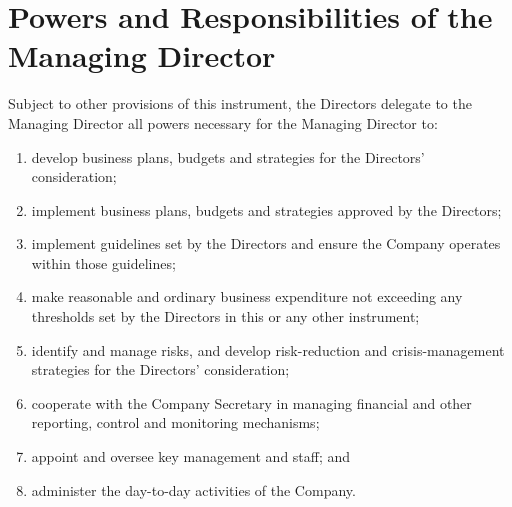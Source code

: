 \documentclass[a4paper,10pt]{article}
\renewcommand{\labelenumi}{(\arabic{enumi})}
\begin{document}
\section{Powers and Responsibilities of the Managing Director}

Subject to other provisions of this instrument, the Directors delegate to the Managing Director all powers necessary for the Managing Director to:

\begin{enumerate}
    \renewcommand{\labelenumi}{(\alph{enumi})}
    \item develop business plans, budgets and strategies for the Directors' consideration;
    \item implement business plans, budgets and strategies approved by the Directors;
    \item implement guidelines set by the Directors and ensure the Company operates within those guidelines;
    \item make reasonable and ordinary business expenditure not exceeding any thresholds set by the Directors in this or any other instrument;
    \item identify and manage risks, and develop risk-reduction and crisis-management strategies for the Directors' consideration;
    \item cooperate with the Company Secretary in managing financial and other reporting, control and monitoring mechanisms;
    \item appoint and oversee key management and staff; and
    \item administer the day-to-day activities of the Company.
\end{enumerate}
\end{document}
